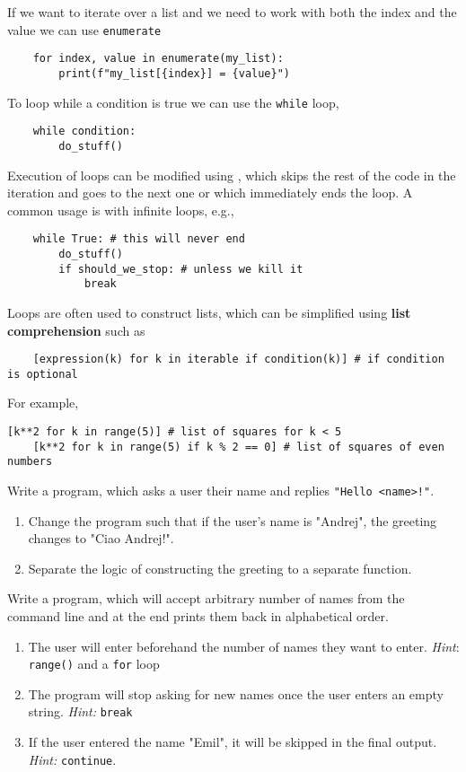 If we want to iterate over a list and we need to work with both the index and the value we can use \lstinline{enumerate}
\begin{lstlisting}
    for index, value in enumerate(my_list):
        print(f"my_list[{index}] = {value}")
\end{lstlisting}

To loop while a condition is true we can use the \verb|while| loop,
\begin{lstlisting}
    while condition:
        do_stuff()
\end{lstlisting}

Execution of loops can be modified using , which skips the rest of the code in the iteration and goes to the next one or  which immediately ends the loop. A common usage is with infinite loops, e.g.,
\begin{lstlisting}
    while True: # this will never end
        do_stuff()
        if should_we_stop: # unless we kill it
            break
\end{lstlisting}

Loops are often used to construct lists, which can be simplified using \textbf{list comprehension} such as
\begin{lstlisting}
    [expression(k) for k in iterable if condition(k)] # if condition is optional
\end{lstlisting}
For example,
\begin{lstlisting}[caption=List comprehension.]
    [k**2 for k in range(5)] # list of squares for k < 5
    [k**2 for k in range(5) if k % 2 == 0] # list of squares of even numbers
\end{lstlisting}

\begin{exercise}
    Write a program, which asks a user their name and replies \verb|"Hello <name>!"|.
    \begin{enumerate}
        \item Change the program such that if the user's name is "Andrej", the greeting changes to "Ciao Andrej!".
        \item Separate the logic of constructing the greeting to a separate function.
    \end{enumerate}
\end{exercise}
\begin{exercise}
    Write a program, which will accept arbitrary number of names from the command line and at the end prints them back in alphabetical order.
    \begin{enumerate}
        \item The user will enter beforehand the number of names they want to enter. \emph{Hint}: \verb|range()| and a \verb|for| loop
        \item The program will stop asking for new names once the user enters an empty string. \emph{Hint:} \verb|break|
        \item If the user entered the name "Emil", it will be skipped in the final output. \emph{Hint:} \verb|continue|.
    \end{enumerate}
\end{exercise}

